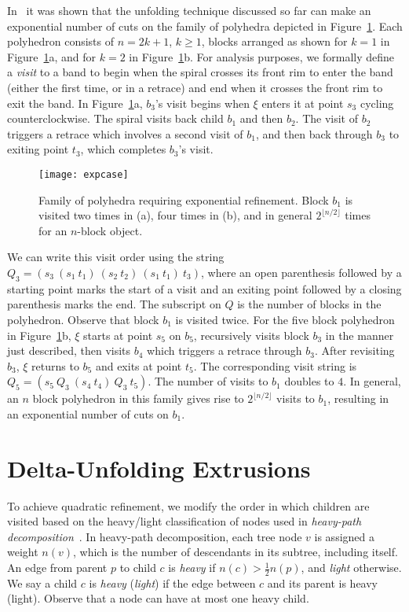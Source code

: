 \documentclass[11pt]{article}
\begin{document}
In~\cite{Damian-Flatland-O'Rourke-2007-epsilon} it was shown that the unfolding technique discussed so far can make an exponential
number of cuts on the family of polyhedra
depicted in Figure~\ref{fig:expcase}. Each polyhedron consists of $n =
2k+1$, $k \geq 1$, blocks
arranged as shown for $k = 1$ in Figure~\ref{fig:expcase}a, and for $k=2$ in Figure~\ref{fig:expcase}b. For analysis purposes, we formally define a \emph{visit} to a band to begin
when the spiral crosses its front rim to enter the band (either the first time, or in a retrace) and
end when it crosses the front rim to exit the band.
In Figure~\ref{fig:expcase}a, $b_3$'s visit begins when $\xi$ enters it at
point $s_3$ cycling counterclockwise. The spiral visits back child
$b_1$ and then $b_2$. The visit of $b_2$ triggers a retrace which involves a second visit of $b_1$, and then
back through $b_3$ to exiting point $t_3$, which completes $b_3$'s visit.
\begin{figure}[htbp]
\centering
\texttt{[image: expcase]}
\caption{Family of polyhedra requiring exponential refinement. Block $b_1$ is visited two times in (a), four times in (b), and in general $2^{\lfloor n/2 \rfloor}$ times for an $n$-block object.}
\label{fig:expcase}
\end{figure}
We can write this visit order using the string
$Q_3 = (s_3 ~(s_1~  t_1)~ (s_2 ~t_2)~ (s_1~ t_1)~ t_3)$, where an open parenthesis followed by a starting point
marks the start of a visit and  an exiting point followed by
a closing parenthesis marks the end.
The subscript on $Q$ is the number of blocks in the polyhedron. Observe that block $b_1$
is visited twice.
For the five block polyhedron in
Figure~\ref{fig:expcase}b, $\xi$ starts at point $s_5$ on $b_5$,
recursively visits block $b_3$ in the
manner just described, then visits $b_4$ which triggers a retrace through $b_3$.
After revisiting $b_3$, $\xi$ returns to $b_5$ and exits at point $t_5$. The corresponding visit string is
$Q_5 = (s_5~Q_3~ (s_4~t_4)~Q_3~ t_5) $.
The number of visits to $b_1$ doubles to $4$. In general,
an $n$ block polyhedron in this family gives rise to
$2^{\lfloor n/2 \rfloor}$ visits to $b_1$, resulting in an exponential
number of cuts on $b_1$.

\section{Delta-Unfolding Extrusions}
\label{sec:Delta}

To achieve quadratic refinement, we modify the
order in which children are visited
based on the heavy/light classification of nodes used in
\emph{heavy-path decomposition}~\cite{Sleator-Tarjan-1983}.
In heavy-path decomposition,
each tree node $v$ is
assigned a weight $n(v)$, which is the number of descendants in its
subtree, including itself.  An edge from parent $p$ to child $c$ is
\emph{heavy} if $n(c) > \frac{1}{2}n(p)$, and \emph{light} otherwise. We say a child
$c$ is \emph{heavy} (\emph{light}) if the edge between $c$ and its parent is heavy (light). Observe that
a node can have at most one heavy child.
\end{document}

